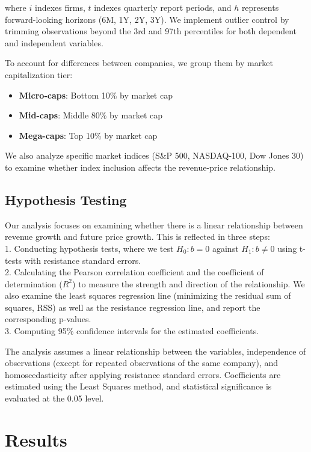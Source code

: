 \documentclass[11pt]{article}
\begin{document}
where $i$ indexes firms, $t$ indexes quarterly report periods, and $h$ represents forward-looking horizons (6M, 1Y, 2Y, 3Y). We implement outlier control by trimming observations beyond the 3rd and 97th percentiles for both dependent and independent variables.

To account for differences between companies, we group them by market capitalization tier:
\begin{itemize}
\item \textbf{Micro-caps}: Bottom 10\% by market cap
\item \textbf{Mid-caps}: Middle 80\% by market cap  
\item \textbf{Mega-caps}: Top 10\% by market cap
\end{itemize}

We also analyze specific market indices (S\&P 500, NASDAQ-100, Dow Jones 30) to examine whether index inclusion affects the revenue-price relationship.

\subsection{Hypothesis Testing}

Our analysis focuses on examining whether there is a linear relationship between revenue growth and future price growth. This is reflected in three steps:  
\\ 1. Conducting hypothesis tests, where we test \( H_0: b = 0 \) against \( H_1: b \neq 0 \) using t-tests with resistance standard errors.
\\ 2. Calculating the Pearson correlation coefficient and the coefficient of determination (\(R^2\)) to measure the strength and direction of the relationship. We also examine the least squares regression line (minimizing the residual sum of squares, RSS) as well as the resistance regression line, and report the corresponding p-values.
\\ 3. Computing 95\% confidence intervals for the estimated coefficients.

The analysis assumes a linear relationship between the variables, independence of observations (except for repeated observations of the same company), and homoscedasticity after applying resistance standard errors. Coefficients are estimated using the Least Squares method, and statistical significance is evaluated at the 0.05 level.

\section{Results}
\end{document}
